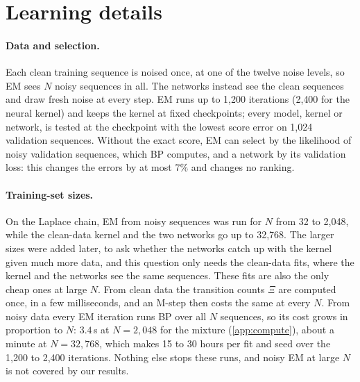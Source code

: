 \section{Learning details}
\label{app:em}

\paragraph{Data and selection.} Each clean training sequence is noised once, at one of the twelve noise levels, so EM
sees $N$ noisy sequences in all. The networks instead see the clean sequences and draw fresh noise at every step. EM runs
up to 1{,}200 iterations (2{,}400 for the neural kernel) and keeps the kernel at fixed checkpoints; every model, kernel or
network, is tested at the checkpoint with the lowest score error on 1{,}024 validation sequences. Without the exact
score, EM can select by the likelihood of noisy validation sequences, which BP computes, and a network by its validation
loss: this changes the errors by at most $7\%$ and changes no ranking.

\paragraph{Training-set sizes.} On the Laplace chain, EM from noisy sequences was run for $N$ from 32 to 2{,}048, while
the clean-data kernel and the two networks go up to 32{,}768. The larger sizes were added later, to ask whether the
networks catch up with the kernel given much more data, and this question only needs the clean-data fits, where the
kernel and the networks see the same sequences. These fits are also the only cheap ones at large $N$. From clean data
the transition counts $\Xi$ are computed once, in a few milliseconds, and an M-step then costs the same at every $N$.
From noisy data every EM iteration runs BP over all $N$ sequences, so its cost grows in proportion to $N$: $3.4$\,s at
$N=2{,}048$ for the mixture (\cref{app:compute}), about a minute at $N=32{,}768$, which makes 15 to 30 hours per fit and
seed over the 1{,}200 to 2{,}400 iterations. Nothing else stops these runs, and noisy EM at large $N$ is not covered by
our results.

